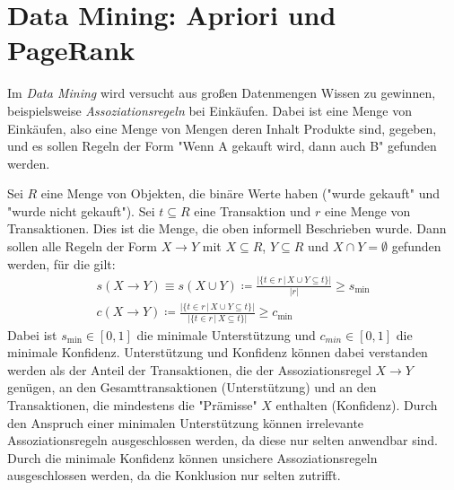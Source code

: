\chapter{Data Mining: Apriori und PageRank}
	Im \emph{Data Mining} wird versucht aus großen Datenmengen Wissen zu gewinnen, beispielsweise \emph{Assoziationsregeln} bei Einkäufen. Dabei ist eine Menge von Einkäufen, also eine Menge von Mengen deren Inhalt Produkte sind, gegeben, und es sollen Regeln der Form "Wenn A gekauft wird, dann auch B" gefunden werden.

	Sei \(R\) eine Menge von Objekten, die binäre Werte haben ("wurde gekauft" und "wurde nicht gekauft"). Sei \( t \subseteq R \) eine Transaktion und \(r\) eine Menge von Transaktionen. Dies ist die Menge, die oben informell Beschrieben wurde. Dann sollen alle Regeln der Form \( X \to Y \) mit \( X \subseteq R \), \( Y \subseteq R \) und \( X \cap Y = \emptyset \) gefunden werden, für die gilt:
	\begin{gather}
		s(X \to Y) \equiv s(X \cup Y) \coloneqq \frac{\bigl\lvert \{ t \in r \,\vert\, X \cup Y \subseteq t \} \bigr\rvert}{\lvert r \rvert} \geq s_\mathrm{min} \\
		c(X \to Y) \coloneqq \frac{\bigl\lvert \{ t \in r \,\vert\, X \cup Y \subseteq t \} \bigr\rvert}{\bigl\lvert \{ t \in r \,\vert\, X \subseteq t \} \bigr\rvert} \geq c_\mathrm{min}
	\end{gather}
	Dabei ist \(s_\mathrm{min} \in [0, 1] \) die minimale Unterstützung und \( c_\mathit{min} \in [0, 1] \) die minimale Konfidenz. Unterstützung und Konfidenz können dabei verstanden werden als der Anteil der Transaktionen, die der Assoziationsregel \(X \to Y\) genügen, an den Gesamttransaktionen (Unterstützung) und an den Transaktionen, die mindestens die "Prämisse" \(X\) enthalten (Konfidenz). Durch den Anspruch einer minimalen Unterstützung können irrelevante Assoziationsregeln ausgeschlossen werden, da diese nur selten anwendbar sind. Durch die minimale Konfidenz können unsichere Assoziationsregeln ausgeschlossen werden, da die Konklusion nur selten zutrifft.

